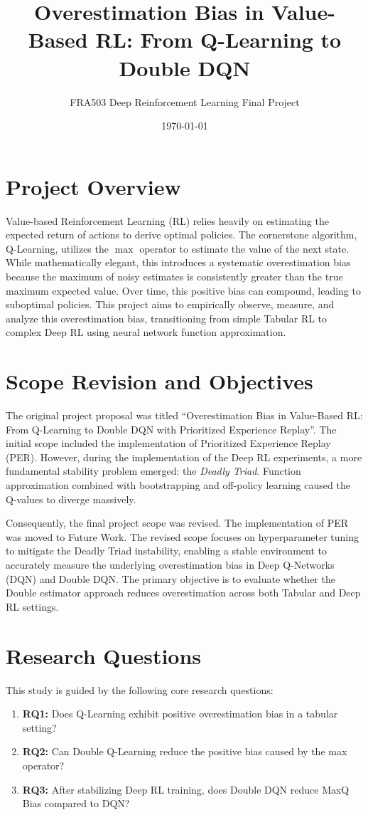 \documentclass[11pt,a4paper]{article}
\title{\textbf{Overestimation Bias in Value-Based RL: From Q-Learning to Double DQN}}
\author{FRA503 Deep Reinforcement Learning Final Project}
\date{\today}
\begin{document}
\maketitle

\section{Project Overview}
Value-based Reinforcement Learning (RL) relies heavily on estimating the expected return of actions to derive optimal policies. The cornerstone algorithm, Q-Learning, utilizes the $\max$ operator to estimate the value of the next state. While mathematically elegant, this introduces a systematic overestimation bias because the maximum of noisy estimates is consistently greater than the true maximum expected value. Over time, this positive bias can compound, leading to suboptimal policies. This project aims to empirically observe, measure, and analyze this overestimation bias, transitioning from simple Tabular RL to complex Deep RL using neural network function approximation.

\section{Scope Revision and Objectives}
The original project proposal was titled ``Overestimation Bias in Value-Based RL: From Q-Learning to Double DQN with Prioritized Experience Replay''. The initial scope included the implementation of Prioritized Experience Replay (PER). However, during the implementation of the Deep RL experiments, a more fundamental stability problem emerged: the \textit{Deadly Triad}. Function approximation combined with bootstrapping and off-policy learning caused the Q-values to diverge massively. 

Consequently, the final project scope was revised. The implementation of PER was moved to Future Work. The revised scope focuses on hyperparameter tuning to mitigate the Deadly Triad instability, enabling a stable environment to accurately measure the underlying overestimation bias in Deep Q-Networks (DQN) and Double DQN. The primary objective is to evaluate whether the Double estimator approach reduces overestimation across both Tabular and Deep RL settings.

\section{Research Questions}
This study is guided by the following core research questions:
\begin{enumerate}
    \item \textbf{RQ1:} Does Q-Learning exhibit positive overestimation bias in a tabular setting?
    \item \textbf{RQ2:} Can Double Q-Learning reduce the positive bias caused by the max operator?
    \item \textbf{RQ3:} After stabilizing Deep RL training, does Double DQN reduce MaxQ Bias compared to DQN?
\end{enumerate}
\end{document}

